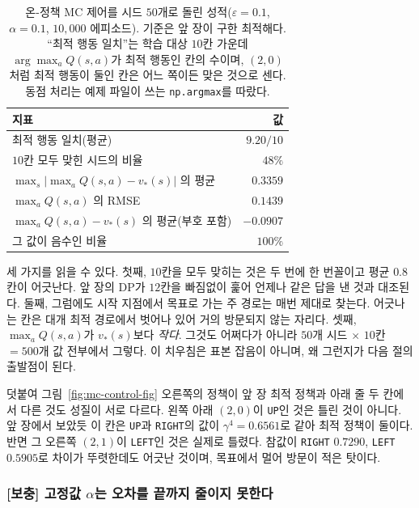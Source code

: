 \documentclass[11pt,a4paper]{article}
\begin{document}
\begin{table}[htbp]
\centering
\caption{온-정책 MC 제어를 시드 $50$개로 돌린 성적($\varepsilon=0.1$, $\alpha=0.1$,
$10{,}000$ 에피소드). 기준은 앞 장이 구한 최적해다. ``최적 행동 일치''는 학습 대상 $10$칸 가운데
$\arg\max_a Q(s,a)$가 최적 행동인 칸의 수이며, $(2,0)$처럼 최적 행동이 둘인 칸은 어느 쪽이든
맞은 것으로 센다. 동점 처리는 예제 파일이 쓰는 \lstinline|np.argmax|를 따랐다.}
\label{tab:control}
\small
\begin{tabular}{@{}lr@{}}
\toprule
지표 & 값 \\
\midrule
최적 행동 일치(평균)                       & $9.20 / 10$ \\
$10$칸 모두 맞힌 시드의 비율               & $48\%$ \\
$\max_s |\max_a Q(s,a) - v_*(s)|$ 의 평균  & $0.3359$ \\
$\max_a Q(s,a)$ 의 RMSE                    & $0.1439$ \\
$\max_a Q(s,a) - v_*(s)$ 의 평균(부호 포함)& $-0.0907$ \\
그 값이 음수인 비율                        & $100\%$ \\
\bottomrule
\end{tabular}
\end{table}

세 가지를 읽을 수 있다. 첫째, $10$칸을 모두 맞히는 것은 두 번에 한 번꼴이고 평균 $0.8$칸이
어긋난다. 앞 장의 DP가 $12$칸을 빠짐없이 훑어 언제나 같은 답을 낸 것과 대조된다. 둘째, 그럼에도
시작 지점에서 목표로 가는 주 경로는 매번 제대로 찾는다. 어긋나는 칸은 대개 최적 경로에서 벗어나 있어
거의 방문되지 않는 자리다. 셋째, $\max_a Q(s,a)$가 $v_*(s)$보다 \emph{작다}. 그것도 어쩌다가 아니라
$50$개 시드 $\times$ $10$칸 $=500$개 값 전부에서 그렇다. 이 치우침은 표본 잡음이 아니며, 왜 그런지가 다음 절의 출발점이 된다.

덧붙여 그림~\ref{fig:mc-control-fig} 오른쪽의 정책이 앞 장 최적 정책과 아래 줄 두 칸에서 다른 것도
성질이 서로 다르다. 왼쪽 아래 $(2,0)$이 \texttt{UP}인 것은 틀린 것이 아니다. 앞 장에서 보았듯 이 칸은
\texttt{UP}과 \texttt{RIGHT}의 값이 $\gamma^4=0.6561$로 같아 최적 정책이 둘이다. 반면 그 오른쪽
$(2,1)$이 \texttt{LEFT}인 것은 실제로 틀렸다. 참값이 \texttt{RIGHT} $0.7290$, \texttt{LEFT} $0.5905$로
차이가 뚜렷한데도 어긋난 것이며, 목표에서 멀어 방문이 적은 탓이다.

\subsubsection{[보충] 고정값 \texorpdfstring{$\alpha$}{alpha}는 오차를 끝까지 줄이지 못한다}
\label{sec:alpha-residual}
\end{document}
